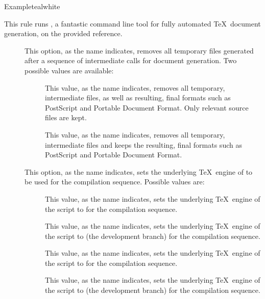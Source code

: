 \begin{description}
\begin{codebox}{Example}{teal}{\icnote}{white}
\end{codebox}

\item[\rulebox{latexmk}]
This rule runs , a fantastic command line tool for fully automated \TeX\ document generation, on the provided  reference.

\begin{description}
\item[] This option, as the name indicates, removes all temporary files generated after a sequence of intermediate calls for document generation. Two possible values are available:

\begin{description}
\item[] This value, as the name indicates, removes all temporary, intermediate files, as well as resulting, final formats such as PostScript and Portable Document Format. Only relevant source files are kept.

\item[] This value, as the name indicates, removes all temporary, intermediate files and keeps the resulting, final formats such as PostScript and Portable Document Format.
\end{description}

\item[] This option, as the name indicates, sets the underlying \TeX\ engine of  to be used for the compilation sequence. Possible values are:

\begin{description}
\item[] This value, as the name indicates, sets the underlying \TeX\ engine of the script to  for the compilation sequence.

\item[] This value, as the name indicates, sets the underlying \TeX\ engine of the script to  (the development branch) for the compilation sequence.

\item[] This value, as the name indicates, sets the underlying \TeX\ engine of the script to  for the compilation sequence.

\item[] This value, as the name indicates, sets the underlying \TeX\ engine of the script to  (the development branch) for the compilation sequence.


\end{description}
\end{description}
\end{description}
